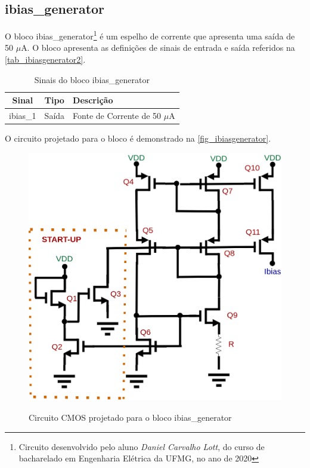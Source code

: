 \renewcommand{\NomeBloco}{ibias\_generator}
\renewcommand{\NomeBlocoNoUnderline}{ibiasgenerator}
\renewcommand{\NomePTab}{tab_\NomeBlocoNoUnderline}
\renewcommand{\NomeSTab}{tab_\NomeBlocoNoUnderline2}
\renewcommand{\NomePFig}{fig_\NomeBlocoNoUnderline}
\renewcommand{\NomeSFig}{fig_\NomeBlocoNoUnderline2}
\renewcommand{\NomeTTab}{tab_\NomeBlocoNoUnderline3}
\renewcommand{\NomeQTab}{tab_\NomeBlocoNoUnderline4}

\subsection{ibias\_generator}
 
O bloco \NomeBloco{}\footnote{Circuito desenvolvido pelo aluno \textit{Daniel Carvalho Lott}, do curso de bacharelado em Engenharia Elétrica da UFMG, no ano de 2020} \'e um espelho de corrente que apresenta uma sa\'ida de 50 $\mu$A. O bloco apresenta as definições de sinais de entrada e sa\'ida referidos na \autoref{\NomeSTab}.

\begin{table}[htbp]
\caption{Sinais do bloco \NomeBloco}
\label{\NomeSTab}
\centering
\begin{tabular}{ccl}

    \toprule
    Sinal & Tipo    & Descrição        \\
    \midrule \midrule
    ibias\_1   & Saída   & Fonte de Corrente de 50 $\mu$A \\
    \bottomrule
\end{tabular}
\end{table}

O circuito projetado para o bloco \'e demonstrado na \autoref{\NomePFig}.

\begin{figure}[htb]
 \centering
    \centering
    \caption{Circuito CMOS projetado para o bloco \NomeBloco} 
    \includegraphics[scale=0.3]{Circuitos/Ibias_generator.png}
    \label{\NomePFig}
\end{figure}

